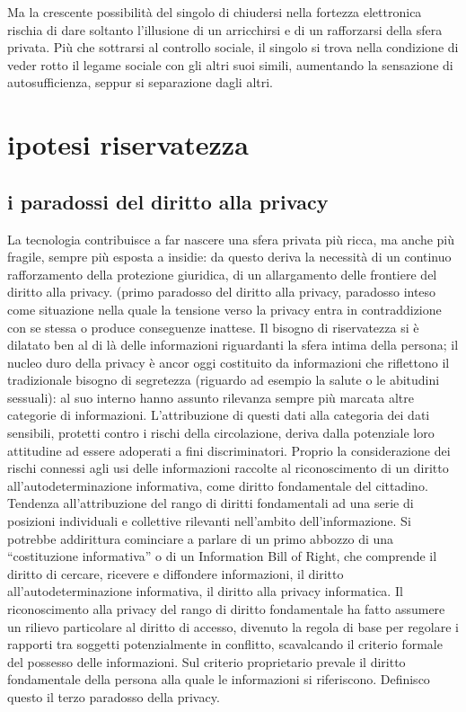 Ma la crescente possibilità del singolo di chiudersi nella fortezza elettronica rischia di dare soltanto l’illusione di un arricchirsi e di un rafforzarsi della sfera privata. Più che sottrarsi al controllo sociale, il singolo si trova nella condizione di veder rotto il legame sociale con gli altri suoi simili, aumentando la sensazione di autosufficienza, seppur si separazione dagli altri.
\section{ipotesi riservatezza}%
\subsection{i paradossi del diritto alla privacy}%
La tecnologia contribuisce a far nascere una sfera privata più ricca, ma anche più fragile, sempre più esposta a insidie: da questo deriva la necessità di un continuo rafforzamento della protezione giuridica, di un allargamento delle frontiere del diritto alla privacy. (primo paradosso del diritto alla privacy, paradosso inteso come situazione nella quale la tensione verso la privacy entra in contraddizione con se stessa o produce conseguenze inattese.
Il bisogno di riservatezza si è dilatato ben al di là delle informazioni riguardanti la sfera intima della persona; il nucleo duro della privacy è ancor oggi costituito da informazioni che riflettono il tradizionale bisogno di segretezza (riguardo ad esempio la salute o le abitudini sessuali): al suo interno hanno assunto rilevanza sempre più marcata altre categorie di informazioni.
L’attribuzione di questi dati alla categoria dei dati sensibili, protetti contro i rischi della circolazione, deriva dalla potenziale loro attitudine ad essere adoperati a fini discriminatori. Proprio la considerazione dei rischi connessi agli usi delle informazioni raccolte al riconoscimento di un diritto all’autodeterminazione informativa, come diritto fondamentale del cittadino.
Tendenza all’attribuzione del rango di diritti fondamentali ad una serie di posizioni individuali e collettive rilevanti nell’ambito dell’informazione. Si potrebbe addirittura cominciare a parlare di un primo abbozzo di una “costituzione informativa” o di un Information Bill of Right, che comprende il diritto di cercare, ricevere e diffondere informazioni, il diritto all’autodeterminazione informativa, il diritto alla privacy informatica.
Il riconoscimento alla privacy del rango di diritto fondamentale ha fatto assumere un rilievo particolare al diritto di accesso, divenuto la regola di base per regolare i rapporti tra soggetti potenzialmente in conflitto, scavalcando il criterio formale del possesso delle informazioni. Sul criterio proprietario prevale il diritto fondamentale della persona alla quale le informazioni si riferiscono. Definisco questo il terzo paradosso della privacy.
